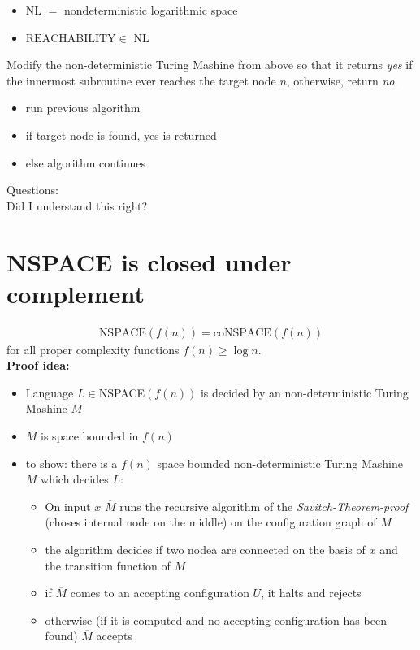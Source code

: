 \documentclass[a4]{scrartcl}
\begin{document}
\begin{itemize}
\item NL $=$ nondeterministic logarithmic space
\item $\overline{\text{REACHABILITY}} \in$ NL
\end{itemize}


Modify the non-deterministic Turing Mashine from above so that it returns \textit{yes} if the innermost subroutine ever reaches the target node $n$, otherwise, return \textit{no}.

\begin{itemize}
\item run previous algorithm
\item if target node is found, yes is returned
\item else algorithm continues
\end{itemize}

\color{violet} Questions: \\
Did I understand this right?
\color{black}



\section*{NSPACE is closed under complement}

\begin{align*}
\text{NSPACE}(f(n)) = \text{coNSPACE}(f(n))
\end{align*}
for all proper complexity functions $f(n) \geq \log n$. \\

\textbf{Proof idea:}
\begin{itemize}
\item Language $L \in $NSPACE$(f(n))$ is decided by an non-deterministic Turing Mashine $M$
\item $M$ is space bounded in $f(n)$
\item to show: there is a $f(n)$ space bounded non-deterministic Turing Mashine $\overline{M}$ which decides $\overline{L}$:
\begin{itemize}
\item On input $x$ $\overline{M}$ runs the recursive algorithm of the \textit{Savitch-Theorem-proof} (choses internal node on the middle) on the configuration graph of $M$
\item the algorithm decides if two nodea are connected on the basis of $x$ and the transition function of $M$
\item if $\overline{M}$ comes to an accepting configuration $U$, it halts and rejects
\item otherwise (if it is computed and no accepting configuration has been found) $\overline{M}$ accepts
\end{itemize}

\end{itemize}





\newpage

\printbibliography
\end{document}
